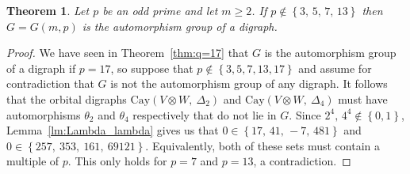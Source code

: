 \documentclass[10pt]{amsart}
\theoremstyle{definition}
\theoremstyle{plain}
\theoremstyle{plain}
\theoremstyle{plain}
\newtheorem{theorem}[theorem]{Theorem}
\theoremstyle{plain}
\newcommand{\Cay}{\mathrm{Cay}}
\begin{document}
\begin{theorem} \label{thm:q-large-prime}
Let $p$ be an odd prime and let $m \geqslant 2$. If $p \notin \left\{3,\, 5,\, 7,\, 13 \right\}$ then $G = G{\left(m, p \right)}$ is the automorphism group of a digraph.
\end{theorem}
\begin{proof}
We have seen in Theorem~\ref{thm:q=17} that $G$ is the automorphism group of a digraph if $p = 17$, so suppose that $p \notin \left\{3, 5, 7, 13, 17 \right\}$ and assume for contradiction that $G$ is not the automorphism group of any digraph. It follows that the orbital digraphs $\Cay{\left(V \otimes W,\ \Delta_2 \right)}$ and $\Cay{\left(V \otimes W,\ \Delta_4 \right)}$ must have automorphisms $\theta_2$ and $\theta_4$ respectively that do not lie in $G$. Since $2^4,\, 4^4 \notin \left\{0, 1 \right\}$, Lemma~\ref{lm:Lambda_lambda} gives us that $0 \in \left\{17,\, 41,\, -7,\, 481 \right\}$ and $0 \in \left\{257,\ 353,\ 161,\ 69121 \right\}$. Equivalently, both of these sets must contain a multiple of $p$. This only holds for $p=7$ and $p=13$, a contradiction.
\end{proof}
\end{document}
